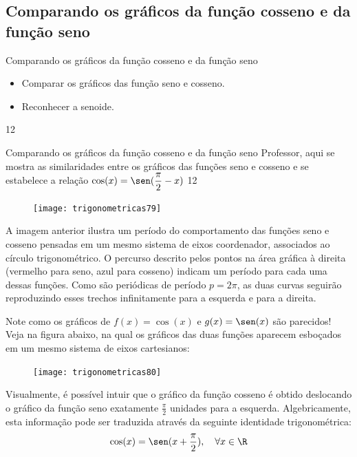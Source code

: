 \clearpage
\subsection{Comparando os gráficos da função cosseno e da função seno}
\begin{objectives}{Comparando os gráficos da função cosseno e da função seno}
{
\begin{itemize}
\item Comparar os gráficos das função seno e cosseno.
\item Reconhecer a senoide.
\end{itemize}
}{1}{2}
\end{objectives}
\begin{sugestions}{Comparando os gráficos da função cosseno e da função seno}
{
Professor, aqui se mostra as similaridades entre os gráficos das funções seno e cosseno e se estabelece a relação $\cos(x)=\sen(\dfrac{\pi}{2}-x)$
}{1}{2}
\end{sugestions}


\begin{figure}[H]
\centering

\texttt{[image: trigonometricas79]}
\end{figure}

A imagem anterior ilustra um período do comportamento das funções seno e cosseno pensadas em um mesmo sistema de eixos coordenador, associados ao círculo trigonométrico. O percurso descrito pelos pontos na área gráfica à direita (vermelho para seno, azul para cosseno) indicam um período para cada uma dessas funções. Como são periódicas de período $p=2\pi$, as duas curvas seguirão reproduzindo esses trechos infinitamente para a esquerda e para a direita.

Note como os gráficos de $f(x) = \cos(x)$ e $g(x) = \sen(x)$ são parecidos! Veja na figura abaixo, na qual os gráficos das duas funções aparecem esboçados em um mesmo sistema de eixos cartesianos:

\begin{figure}[H]
\centering

\texttt{[image: trigonometricas80]}
\end{figure}

Visualmente, é possível intuir que o gráfico da função cosseno é obtido deslocando o gráfico da função seno exatamente $\frac{\pi}{2}$ unidades para a esquerda. Algebricamente, esta informação pode ser traduzida através da seguinte identidade trigonométrica:
\begin{equation*}
\cos(x)=\sen(x+\frac{\pi}{2}),\quad\forall x\in\R
\end{equation*}

